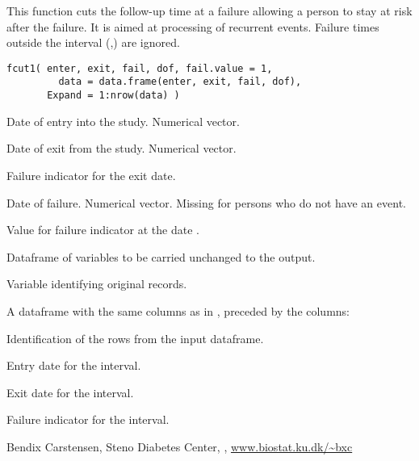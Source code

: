 \begin{Description}\relax
This function cuts the follow-up time at a failure allowing a person
to stay at risk after the failure. It is aimed at processing of
recurrent events. Failure times outside the interval
(,) are ignored.
\end{Description}
\begin{Usage}
\begin{verbatim}
fcut1( enter, exit, fail, dof, fail.value = 1, 
         data = data.frame(enter, exit, fail, dof),
       Expand = 1:nrow(data) )
\end{verbatim}
\end{Usage}
\begin{Arguments}
\begin{ldescription}
\item[\code{enter}] Date of entry into the study. Numerical vector.
\item[\code{exit}] Date of exit from the study. Numerical vector.
\item[\code{fail}] Failure indicator for the exit date.
\item[\code{dof}] Date of failure. Numerical vector. Missing for persons who
do not have an event.
\item[\code{fail.value}] Value for failure indicator  at the date
.
\item[\code{data}] Dataframe of variables to be carried unchanged to the
output.
\item[\code{Expand}] Variable identifying original records.
\end{ldescription}
\end{Arguments}
\begin{Value}
A dataframe with the same columns as in , preceded by the columns:
\begin{ldescription}
\item[\code{Expand}] Identification of the rows from the input dataframe.
\item[\code{Enter}] Entry date for the interval.
\item[\code{Exit}] Exit date for the interval.
\item[\code{Fail}] Failure indicator for the interval.
\end{ldescription}
\end{Value}
\begin{Author}\relax
Bendix Carstensen, Steno Diabetes Center,
, \url{www.biostat.ku.dk/~bxc}
\end{Author}
